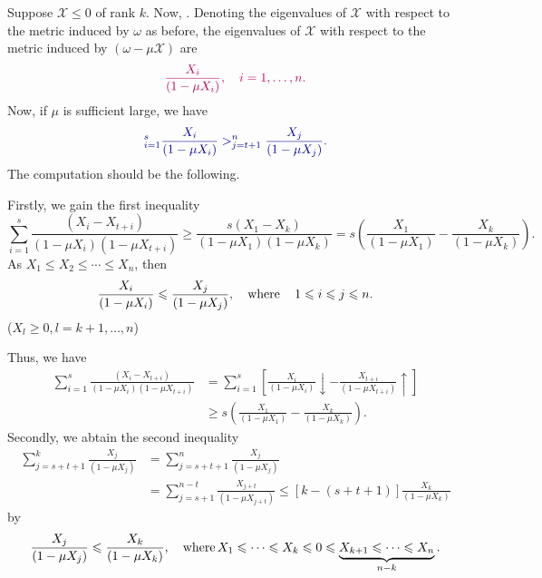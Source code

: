 \documentclass[lang=en,12pt]{beautybook}
\begin{document}
Suppose $\mathcal{X} \leqslant 0$ of rank $k$. Now,
. Denoting
  {\color[HTML]{800080}the eigenvalues of $\mathcal{X}$ with respect to the
    metric induced by $\omega$ as before}, {\color[HTML]{B4005A}the eigenvalues of
    $\mathcal{X}$ with respect to the metric induced by $(\omega - \mu
      \mathcal{X})$ are }
\[ {\color[HTML]{B4005A}\frac{X_i}{(1 - \mu X_i)}, \quad i = 1, \ldots, n.} \]
Now, if $\mu$ is sufficient large, we have
\begin{equation}
  \tmcolor{DarkBlue}{\sum_{i = 1}^s \frac{X_i}{(1 - \mu X_i)} > \sum_{j = t + 1}^n
    \frac{X_j}{(1 - \mu X_j)} .} \label{4}
\end{equation}
The computation should be the following.

Firstly, we gain the first inequality
\[ \sum_{i = 1}^s \frac{(X_i - X_{t + i})}{(1 - \mu X_i) (1 - \mu X_{t + i})}
  \geqslant \frac{s (X_1 - X_k)}{(1 - \mu X_1) (1 - \mu X_k)} = s \left(
  \frac{X_1}{(1 - \mu X_1)} - \frac{X_k}{(1 - \mu X_k)} \right) . \]
As $X_1 \leqslant X_2 \leqslant \cdots \leqslant X_n$, then
\[ \frac{X_i}{(1 - \mu X_i)} \leqslant \frac{X_j}{(1 - \mu X_j)}, \quad
  \operatorname{where} \quad 1 \leqslant i \leqslant j \leqslant n. \]
 ($X_l
\geqslant 0, l = k + 1, \ldots, n$)

Thus, we have
\begin{align*}
  \sum_{i = 1}^s \frac{(X_i - X_{t + i})}{(1 - \mu X_i) (1 - \mu X_{t + i})}
   & = \sum_{i = 1}^s \left[ \frac{X_i}{(1 - \mu X_i)} \downarrow - \frac{X_{t +
  i}}{(1 - \mu X_{t + i})} \uparrow \right]                                      \\
   & \geqslant s \left( \frac{X_1}{(1
      - \mu X_1)} - \frac{X_k}{(1 - \mu X_k)} \right) .
\end{align*}
Secondly, we abtain the second inequality
\begin{align*}
  \sum_{j = s + t + 1}^k \frac{X_j}{(1 - \mu X_j)} & = \sum_{j = s + t + 1}^n
  \frac{X_j}{(1 - \mu X_j)}                                                                           \\
                                                   & = \sum_{j = s + 1}^{n - t} \frac{X_{j + t}}{(1 -
    \mu X_{j + t})} \leqslant [k - (s + t + 1)] \frac{X_k}{(1 - \mu X_k)}
\end{align*}
by
\[ \frac{X_j}{(1 - \mu X_j)} \leqslant \frac{X_k}{(1 - \mu X_k)}, \quad
  \operatorname{where} X_1 \leqslant \cdots \leqslant X_k \leqslant  0
  \leqslant\underbrace{ X_{k + 1} \leqslant \cdots \leqslant X_n}_{n - k} .
\]
\end{document}
